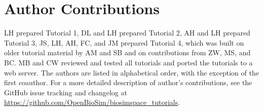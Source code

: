 \documentclass[9pt,tutorial,pubversion]{livecoms}
\newcommand{\githubrepository}{\url{https://github.com/OpenBioSim/biosimspace_tutorials}}  %
\begin{document}
%
%

%

\section{Author Contributions}
%
LH prepared Tutorial 1, DL and LH prepared Tutorial 2, AH and LH prepared Tutorial 3, JS, LH, AH, FC, and JM prepared Tutorial 4, which was built on older tutorial material by AM and SB and on contributions from ZW, MS, and BC. MB and CW reviewed and tested all tutorials and ported the tutorials to a web server. The authors are listed in alphabetical order, with the exception of the first coauthor.
For a more detailed description of author's contributions,
see the GitHub issue tracking and changelog at \githubrepository.
\end{document}
